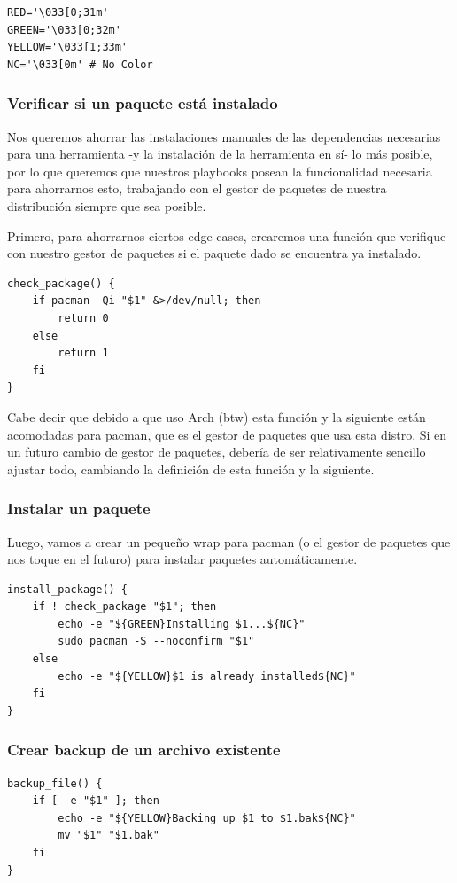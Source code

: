 \documentclass[11pt]{article}
\begin{document}
\begin{verbatim}
RED='\033[0;31m'
GREEN='\033[0;32m'
YELLOW='\033[1;33m'
NC='\033[0m' # No Color
\end{verbatim}
\subsubsection{Verificar si un paquete está instalado}
\label{sec:org63701a7}
Nos queremos ahorrar las instalaciones manuales de las dependencias necesarias para una herramienta -y la instalación de la herramienta en sí- lo más posible, por lo que queremos que nuestros playbooks posean la funcionalidad necesaria para ahorrarnos esto, trabajando con el gestor de paquetes de nuestra distribución siempre que sea posible.

Primero, para ahorrarnos ciertos edge cases, crearemos una función que verifique con nuestro gestor de paquetes si el paquete dado se encuentra ya instalado.

\begin{verbatim}
check_package() {
    if pacman -Qi "$1" &>/dev/null; then
        return 0
    else
        return 1
    fi
}
\end{verbatim}

Cabe decir que debido a que uso Arch (btw) esta función y la siguiente están acomodadas para pacman, que es el gestor de paquetes que usa esta distro. Si en un futuro cambio de gestor de paquetes, debería de ser relativamente sencillo ajustar todo, cambiando la definición de esta función y la siguiente.
\subsubsection{Instalar un paquete}
\label{sec:orga18deb4}
Luego, vamos a crear un pequeño wrap para pacman (o el gestor de paquetes que nos toque en el futuro) para instalar paquetes automáticamente.

\begin{verbatim}
install_package() {
    if ! check_package "$1"; then
        echo -e "${GREEN}Installing $1...${NC}"
        sudo pacman -S --noconfirm "$1"
    else
        echo -e "${YELLOW}$1 is already installed${NC}"
    fi
}
\end{verbatim}
\subsubsection{Crear backup de un archivo existente}
\label{sec:org7c66993}

\begin{verbatim}
backup_file() {
    if [ -e "$1" ]; then
        echo -e "${YELLOW}Backing up $1 to $1.bak${NC}"
        mv "$1" "$1.bak"
    fi
}
\end{verbatim}
\end{document}
